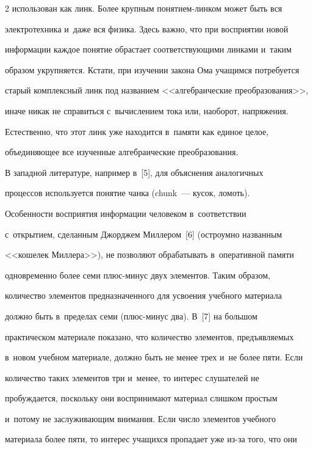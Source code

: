\begin{multicols}{2}
использован как линк. Более крупным по\-ня\-ти\-ем-лин\-ком может быть вся 


электротехника и~даже вся физика. Здесь важно, что при восприятии новой 


информации каждое понятие обрастает соответствующими линками и~таким 


образом укрупняется. Кстати, при изучении закона Ома учащимся потребуется 


старый комплексный линк под названием <<алгебраические преобразования>>, 


иначе никак не справиться с~вычислением тока или, наоборот, напряжения. 


Естественно, что этот линк уже находится в~памяти как единое целое, 


объединяющее все изученные ал\-геб\-ра\-и\-че\-ские преобразования.


  


  В западной литературе, например в~[5], для объяснения аналогичных 


процессов используется понятие чанка (chunk~--- кусок, ломоть). 


  


  Особенности восприятия информации человеком в~соответствии 


с~открытием, сделанным Джорджем Миллером~[6] (остроумно названным 


<<кошелек Миллера>>), не позволяют обрабатывать в~оператив\-ной памяти 


одновременно более семи плюс-ми\-нус двух элементов. Таким образом, 


количество элементов предназначенного для усвоения учебного материала 


должно быть в~пределах семи (плюс-ми\-нус два). В~[7] на большом 


практическом материале показано, что количество элементов, предъявляемых 


в~новом учебном материале, должно быть не менее трех и~не более пяти. Если 


количество таких элементов три и~менее, то интерес слушателей не 


пробуждается, поскольку они воспринимают материал слишком простым 


и~потому не заслуживающим внимания. Если число элементов учебного 


материала более пяти, то интерес учащихся пропадает уже из-за того, что они 



\end{multicols}
